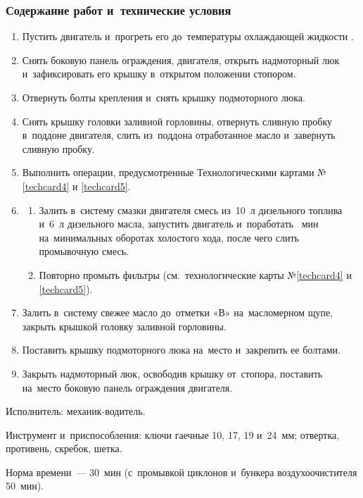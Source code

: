 \subsubsection{Содержание работ и~технические условия}

\begin{enumerate}
    \item Пустить двигатель и~прогреть его до~температуры охлаждающей жидкости . 
    \item Снять боковую панель ограждения, двигателя, открыть надмоторный люк и~зафиксировать его крышку в~открытом положении стопором. 
    \item Отвернуть болты крепления и~снять крышку подмоторного люка. 
    \item Снять крышку головки заливной горловины, отвернуть сливную пробку в~поддоне двигателя, слить из~поддона отработанное масло и~завернуть сливную пробку. 
    \item Выполнить операции, предусмотренные Технологическими картами №\ref{techcard4} и \ref{techcard5}. 
    \item \begin{enumerate}
        \item Залить в~систему смазки двигателя смесь из~10~л дизельного топлива и~6~л дизельного масла, запустить двигатель и~поработать ~мин на~минимальных оборотах холостого хода, после чего слить промывочную смесь. 
        \item Повторно промыть фильтры (см.~технологические карты №\ref{techcard4} и \ref{techcard5}). 
    \end{enumerate}
    \item Залить в~систему свежее масло до~отметки «В» на~масломерном щупе, закрыть крышкой головку заливной горловины. 
    \item Поставить крышку подмоторного люка на~место и~закрепить ее болтами. 
    \item Закрыть надмоторный люк, освободив крышку от~стопора, поставить на~место боковую панель ограждения двигателя. 
\end{enumerate}

\noindent
Исполнитель: механик-водитель. 

\noindent
Инструмент и~приспособления: ключи гаечные 10, 17, 19 и~24~мм; отвертка, противень, скребок, шетка. 

\noindent
Норма времени~--- 30~мин (с~промывкой циклонов и~бункера воздухоочистителя 50~мин). 

